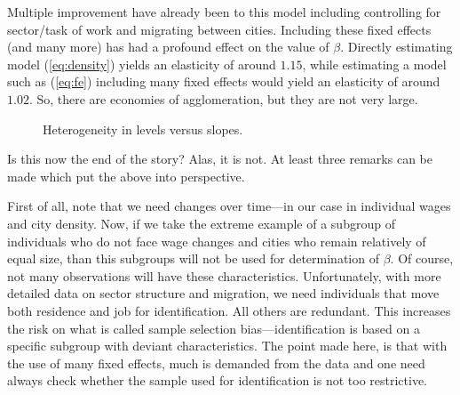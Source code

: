 \documentclass[fleqn,10pt]{SelfArx} %
\begin{document}
Multiple improvement have already been to this model including controlling for
sector/task of work and migrating between cities. Including these fixed effects
(and many more) has had a profound effect on the value of $\beta$. Directly
estimating model (\ref{eq:density}) yields an elasticity of around $1.15$,
while estimating a model such as (\ref{eq:fe}) including many fixed effects
would yield an elasticity of around $1.02$. So, there are economies of
agglomeration, but they are not very large.

\begin{figure}[t!]\centering 
	\hfill
	\caption{Heterogeneity in levels versus slopes.}
	\label{fig:heterogeneity}
\end{figure}

Is this now the end of the story? Alas, it is not. At least three remarks can be
made which put the above into perspective.

First of all, note that we need changes over time---in our case in individual wages and
city density. Now, if we take the extreme example of a subgroup of individuals
who do not face wage changes and cities who remain relatively of equal size,
than this subgroups will not be used for determination of $\beta$. Of course,
not many observations will have these characteristics. Unfortunately, with
more detailed data on sector structure and migration, we need individuals that
move both residence and job for identification. All others are redundant. This
increases the risk on what is called sample selection bias---identification is
based on a specific subgroup with deviant characteristics. The point made here,
is that with the use of many fixed effects, much is demanded from the data and
one need always check whether the sample used for identification is not too
restrictive.  
\end{document}
